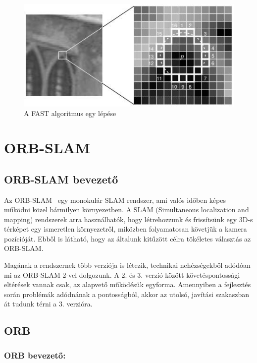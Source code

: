 \begin{figure}
	\centering
	\captionsetup{justification=centering}
	\includegraphics[width=1.7\columnwidth]{figs/fast_corner_detector.jpg}
	\vspace{-10pt}
	\caption{A FAST algoritmus egy lépése}
	\vspace{-10pt}
	\label{fig:FAST}
\end{figure}


\section{ORB-SLAM}

\subsection{ORB-SLAM bevezető}

Az ORB-SLAM~\cite{7219438} egy monokulár SLAM rendszer, ami valós időben képes működni közel bármilyen környezetben. 
A SLAM (Simultaneous localization and mapping) rendszerek arra használhatók, hogy létrehozzunk és frissítsünk egy 3D-s térképet egy ismeretlen környezetről, miközben folyamatosan követjük a kamera pozícióját. 
Ebből is látható, hogy az általunk kitűzött célra tökéletes választás az ORB-SLAM.

Magának a rendszernek több verziója is létezik, technikai nehézségekből adódóan mi az ORB-SLAM 2-vel dolgozunk. 
A 2. és 3. verzió között követéspontossági eltérések vannak csak, az alapvető működésük egyforma. 
Amennyiben a fejlesztés során problémák adódnának a pontosságból, akkor az utolsó, javítási szakaszban át tudunk térni a 3. verzióra.

\subsection{ORB}

\subsubsection{ORB bevezető:}

